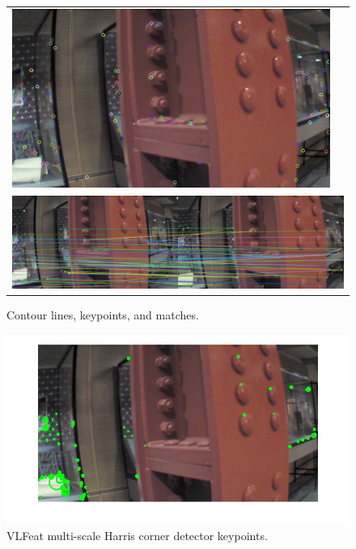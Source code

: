 \documentclass{acmsiggraph}
\begin{document}
\begin{figure}[h]
\begin{tabular}{cc}
    \includegraphics[resolution=150, scale=0.75]{images/contour-kp2} \\
    \multicolumn{2}{c}{\includegraphics[resolution=150, scale=0.77]{images/contour-matches}}
  \end{tabular}
  \caption{Contour lines, keypoints, and matches.}
  \label{fig:contour-ex}
\end{figure}

\begin{figure}[h]
  \centering
  \includegraphics[resolution=150, scale=0.75]{images/vlfeat-kp2}
  \caption{VLFeat multi-scale Harris corner detector keypoints.}
  \label{fig:vlfeat-ex}
\end{figure}
\end{document}
